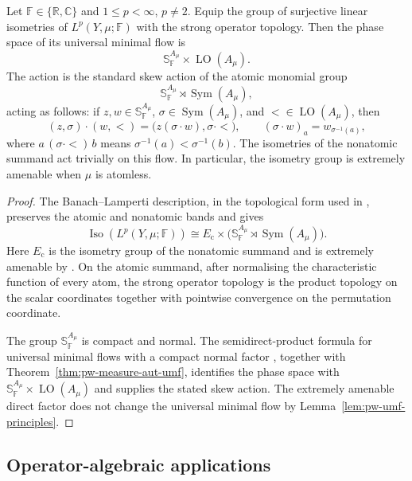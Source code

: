 \begin{theorem}\label{thm:pw-lp-isometry-umf}
Let \(\mathbb F\in\{\mathbb R,\mathbb C\}\) and
\(1\leq p<\infty\), \(p\ne2\). Equip the group of surjective linear
isometries of \(L^p(Y,\mu;\mathbb F)\) with the strong operator topology. Then
the phase space of its universal minimal flow is
\[
\mathbb S_{\mathbb F}^{A_\mu}\times\operatorname{LO}(A_\mu).
\]
The action is the standard skew action of the atomic monomial group
\[
\mathbb S_{\mathbb F}^{A_\mu}\rtimes
\operatorname{Sym}(A_\mu),
\]
acting as follows: if \(z,w\in\mathbb S_{\mathbb F}^{A_\mu}\),
\(\sigma\in\operatorname{Sym}(A_\mu)\), and
\(<\in\operatorname{LO}(A_\mu)\), then
\[
 (z,\sigma)\mathbin{\cdot}(w,<)
 =\bigl(z(\sigma\mathbin{\cdot}w),\sigma\mathbin{\cdot}<\bigr),
 \qquad
 (\sigma\mathbin{\cdot}w)_a=w_{\sigma^{-1}(a)},
\]
where \(a\,(\sigma\mathbin{\cdot}<)\,b\) means
\(\sigma^{-1}(a)<\sigma^{-1}(b)\). The isometries of the nonatomic summand
act trivially on this flow. In
particular, the isometry group is extremely amenable when \(\mu\) is atomless.
\end{theorem}

\begin{proof}
The Banach--Lamperti description, in the topological form used in
\cite[Section~6.2]{GiordanoPestov2007}, preserves the atomic and nonatomic bands and gives
\[
\operatorname{Iso}(L^p(Y,\mu;\mathbb F))
\cong E_{\mathrm c}\times
 \bigl(\mathbb S_{\mathbb F}^{A_\mu}\rtimes
       \operatorname{Sym}(A_\mu)\bigr).
\]
Here \(E_{\mathrm c}\) is the isometry group of the nonatomic summand and is
extremely amenable by \cite[Theorem~6.6]{GiordanoPestov2007}. On the atomic summand, after
normalising the characteristic function of every atom, the strong operator
topology is the product topology on the scalar coordinates together with
pointwise convergence on the permutation coordinate.

The group \(\mathbb S_{\mathbb F}^{A_\mu}\) is compact and normal. The
semidirect-product formula for universal minimal flows with a compact normal
factor \cite[Proposition~6.1]{KechrisSokic2012}, together with Theorem~\ref{thm:pw-measure-aut-umf},
identifies the phase space with
\(\mathbb S_{\mathbb F}^{A_\mu}\times\operatorname{LO}(A_\mu)\) and supplies
the stated skew action. The extremely amenable direct factor does not change
the universal minimal flow by Lemma~\ref{lem:pw-umf-principles}.
\end{proof}


\subsection{Operator-algebraic applications}
\label{sec:pw-operator}


